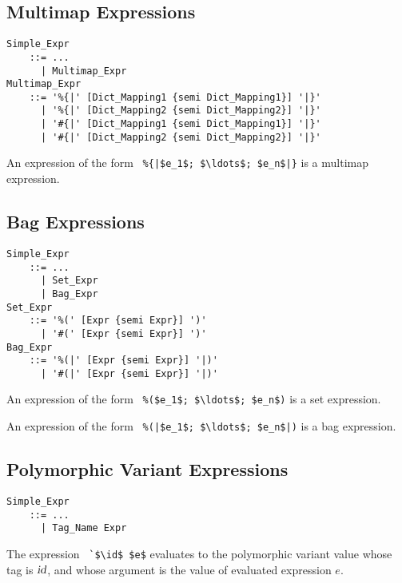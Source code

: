 \subsection{Multimap Expressions}
\label{sec:multimap-expressions}

\grammar\begin{lstlisting}
Simple_Expr 
    ::= ...
      | Multimap_Expr
Multimap_Expr 
    ::= '%{|' [Dict_Mapping1 {semi Dict_Mapping1}] '|}'
      | '%{|' [Dict_Mapping2 {semi Dict_Mapping2}] '|}'
      | '#{|' [Dict_Mapping1 {semi Dict_Mapping1}] '|}'
      | '#{|' [Dict_Mapping2 {semi Dict_Mapping2}] '|}'
\end{lstlisting}

An expression of the form ~\lstinline!%{|$e_1$; $\ldots$; $e_n$|}! is a multimap expression. 






\subsection{Bag Expressions}
\label{sec:bag-expressions}

\grammar\begin{lstlisting}
Simple_Expr 
    ::= ...
      | Set_Expr
      | Bag_Expr
Set_Expr
    ::= '%(' [Expr {semi Expr}] ')'
      | '#(' [Expr {semi Expr}] ')'
Bag_Expr
    ::= '%(|' [Expr {semi Expr}] '|)'
      | '#(|' [Expr {semi Expr}] '|)'
\end{lstlisting}

An expression of the form ~\lstinline!%($e_1$; $\ldots$; $e_n$)! is a set expression. 

An expression of the form ~\lstinline!%(|$e_1$; $\ldots$; $e_n$|)! is a bag expression.





\subsection{Polymorphic Variant Expressions}
\label{sec:polymorphic-variant-expressions}

\grammar\begin{lstlisting}
Simple_Expr 
    ::= ...
      | Tag_Name Expr
\end{lstlisting}

The expression ~\lstinline!`$\id$ $e$! evaluates to the polymorphic variant value whose tag is $\mbox{\sl id}$, and whose argument is the value of evaluated expression $e$. 





